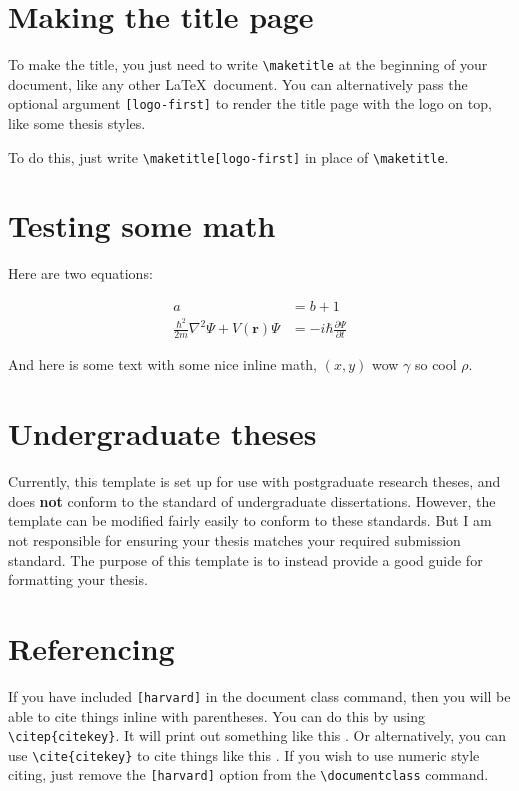 \section{Making the title page}
To make the title, you just need to write \texttt{\textbackslash maketitle} at the beginning of your document, like any other \LaTeX~document. You can alternatively pass the optional argument \texttt{[logo-first]} to render the title page with the logo on top, like some thesis styles. 

To do this, just write \texttt{\textbackslash maketitle[logo-first]} in place of \texttt{\textbackslash maketitle}.

\section{Testing some math}
Here are two equations:

\begin{align}
a &= b + 1 \\
\frac{\hbar^2}{2m}\nabla^2\Psi + V(\mathbf{r})\Psi
&= -i\hbar \frac{\partial\Psi}{\partial t}    
\end{align}


And here is some text with some nice inline math, $(x, y)$ wow $\gamma$ so cool $\rho$.


\section{Undergraduate theses}
Currently, this template is set up for use with postgraduate research theses, and does \textbf{not} conform to the standard of undergraduate dissertations. However, the template can be modified fairly easily to conform to these standards. But I am not responsible for ensuring your thesis matches your required submission standard. The purpose of this template is to instead provide a good guide for formatting your thesis.

\section{Referencing}
If you have included \texttt{[harvard]} in the document class command, then you will be able to cite things inline with parentheses. You can do this by using \texttt{\textbackslash citep\{citekey\}}. It will print out something like this \citep{aad2012observation}. Or alternatively, you can use \texttt{\textbackslash cite\{citekey\}} to cite things like this \cite{chatrchyan2012observation}. If you wish to use numeric style citing, just remove the \texttt{[harvard]} option from the \texttt{\textbackslash documentclass} command.

